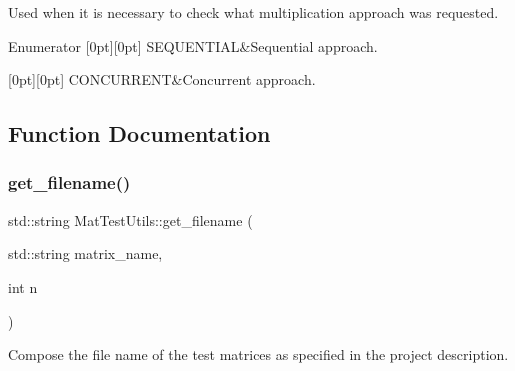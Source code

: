 Used when it is necessary to check what multiplication approach was requested. \begin{DoxyEnumFields}{Enumerator}
[0pt][0pt]{}\mbox{\label{namespaceMatTestUtils_a8ce892071d861e65dd62ef377efaaa6ba3b3a618fe07801523cfe25e59e502fa4}} 
S\+E\+Q\+U\+E\+N\+T\+I\+AL&Sequential approach. \\
\hline

[0pt][0pt]{}\mbox{\label{namespaceMatTestUtils_a8ce892071d861e65dd62ef377efaaa6ba5badfe0e296c0508584ff1561872a74c}} 
C\+O\+N\+C\+U\+R\+R\+E\+NT&Concurrent approach. \\
\hline

\end{DoxyEnumFields}


\subsection{Function Documentation}
\mbox{\label{namespaceMatTestUtils_a9e032c504f598952db985df790a0bcaa}} 
\subsubsection{\texorpdfstring{get\+\_\+filename()}{get\_filename()}}
{\footnotesize\ttfamily std\+::string Mat\+Test\+Utils\+::get\+\_\+filename (\begin{DoxyParamCaption}\item[{std\+::string}]{matrix\+\_\+name,  }\item[{int}]{n }\end{DoxyParamCaption})}



Compose the file name of the test matrices as specified in the project description. 


